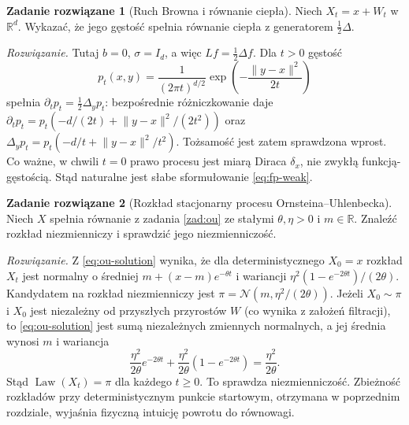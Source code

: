 \documentclass[11pt,a4paper,oneside]{report}
\numberwithin{equation}{chapter}
\theoremstyle{plain}
\theoremstyle{definition}
\newtheorem{zadanie}{Zadanie rozwiązane}[chapter]
\theoremstyle{remark}
\newcommand{\R}{\mathbb{R}}
\newcommand{\Law}{\operatorname{Law}}
\newcommand{\norm}[1]{\lVert #1\rVert}
\newcommand{\Normal}{\mathcal{N}}
\begin{document}
\begin{zadanie}[Ruch Browna i równanie ciepła]
Niech $X_t=x+W_t$ w $\R^d$. Wykazać, że jego gęstość
spełnia równanie ciepła z generatorem $\tfrac12\Delta$.

\emph{Rozwiązanie.} Tutaj $b=0$, $\sigma=I_d$,
a więc $Lf=\tfrac12\Delta f$. Dla $t>0$ gęstość
\[
p_t(x,y)=\frac1{(2\pi t)^{d/2}}
\exp\!\left(-\frac{\norm{y-x}^2}{2t}\right)
\]
spełnia $\partial_t p_t=\frac12\Delta_y p_t$:
bezpośrednie różniczkowanie daje
$\partial_t p_t=p_t(-d/(2t)+\norm{y-x}^2/(2t^2))$
oraz
$\Delta_y p_t=p_t(-d/t+\norm{y-x}^2/t^2)$.
Tożsamość jest zatem sprawdzona wprost.
Co ważne, w chwili $t=0$ prawo procesu jest miarą
Diraca $\delta_x$, nie zwykłą funkcją-gęstością.
Stąd naturalne jest słabe sformułowanie
\eqref{eq:fp-weak}.
\end{zadanie}

\begin{zadanie}[Rozkład stacjonarny procesu Ornsteina--Uhlenbecka]
Niech $X$ spełnia równanie z zadania \ref{zad:ou}
ze stałymi $\theta,\eta>0$ i $m\in\R$.
Znaleźć rozkład niezmienniczy i sprawdzić jego
niezmienniczość.

\emph{Rozwiązanie.} Z \eqref{eq:ou-solution}
wynika, że dla deterministycznego $X_0=x$ rozkład
$X_t$ jest normalny o średniej
$m+(x-m)e^{-\theta t}$ i wariancji
$\eta^2(1-e^{-2\theta t})/(2\theta)$.
Kandydatem na rozkład niezmienniczy jest
$\pi=\Normal(m,\eta^2/(2\theta))$.
Jeżeli $X_0\sim\pi$ i $X_0$ jest niezależny od
przyszłych przyrostów $W$ (co wynika z założeń
filtracji), to \eqref{eq:ou-solution} jest sumą
niezależnych zmiennych normalnych, a jej średnia
wynosi $m$ i wariancja
\[
\frac{\eta^2}{2\theta}e^{-2\theta t}
+\frac{\eta^2}{2\theta}(1-e^{-2\theta t})
=\frac{\eta^2}{2\theta}.
\]
Stąd $\Law(X_t)=\pi$ dla każdego $t\ge0$.
To sprawdza niezmienniczość. Zbieżność rozkładów
przy deterministycznym punkcie startowym, otrzymana
w poprzednim rozdziale, wyjaśnia fizyczną intuicję
powrotu do równowagi.
\end{zadanie}
\end{document}
